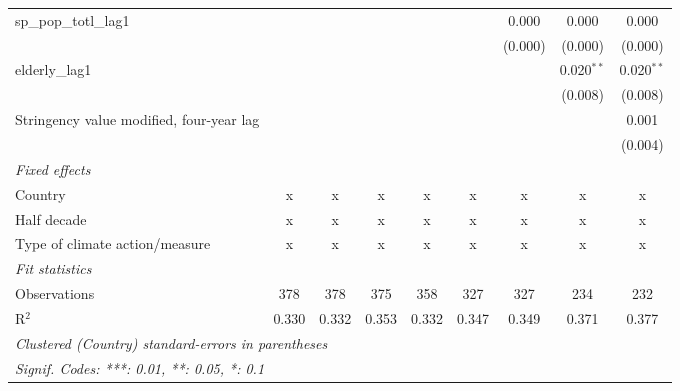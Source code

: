 \begin{tabular}{lcccccccc}
   sp\_pop\_totl\_lag1                             &               &               &               &               &         & 0.000   & 0.000        & 0.000\\   
                                                   &               &               &               &               &         & (0.000) & (0.000)      & (0.000)\\   
   elderly\_lag1                                   &               &               &               &               &         &         & 0.020$^{**}$ & 0.020$^{**}$\\   
                                                   &               &               &               &               &         &         & (0.008)      & (0.008)\\   
   Stringency value modified, four-year lag        &               &               &               &               &         &         &              & 0.001\\   
                                                   &               &               &               &               &         &         &              & (0.004)\\   
   \emph{Fixed effects}\\
   Country                                         & x             & x             & x             & x             & x       & x       & x            & x\\  
   Half decade                                     & x             & x             & x             & x             & x       & x       & x            & x\\  
   Type of climate action/measure                  & x             & x             & x             & x             & x       & x       & x            & x\\  
   \midrule \emph{Fit statistics}\\
   Observations                                    & 378           & 378           & 375           & 358           & 327     & 327     & 234          & 232\\  
   R$^2$                                           & 0.330         & 0.332         & 0.353         & 0.332         & 0.347   & 0.349   & 0.371        & 0.377\\  
   \midrule
   \multicolumn{9}{l}{\emph{Clustered (Country) standard-errors in parentheses}}\\
   \multicolumn{9}{l}{\emph{Signif. Codes: ***: 0.01, **: 0.05, *: 0.1}}\\
\end{tabular}
\par\endgroup


